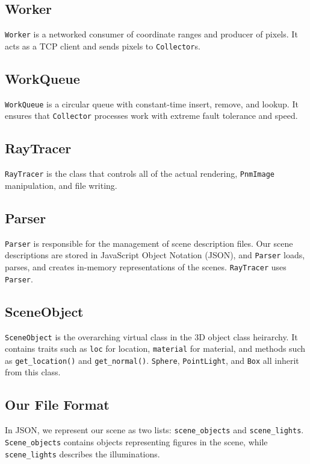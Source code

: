 \documentclass[letterpaper,twocolumn,10pt]{article}
\begin{document}
\subsection{Worker}

\verb|Worker| is a networked consumer of coordinate ranges and producer of
pixels. It acts as a TCP client and sends pixels to \verb|Collector|s.

\subsection{WorkQueue}

\verb|WorkQueue| is a circular queue with constant-time insert, remove, and
lookup. It ensures that \verb|Collector| processes work with extreme fault
tolerance and speed.

\subsection{RayTracer}

\verb|RayTracer| is the class that controls all of the actual rendering,
\verb|PnmImage| manipulation, and file writing.

\subsection{Parser}

\verb|Parser| is responsible for the management of scene description files. Our
scene descriptions are stored in JavaScript Object Notation (JSON), and
\verb|Parser| loads, parses, and creates in-memory representations of the
scenes. \verb|RayTracer| uses \verb|Parser|.

\subsection{SceneObject}

\verb|SceneObject| is the overarching virtual class in the 3D object class
heirarchy. It contains traits such as \verb|loc| for location, \verb|material|
for material, and methods such as \verb|get_location()| and \verb|get_normal()|.
\verb|Sphere|, \verb|PointLight|, and \verb|Box| all inherit from this class.

\subsection{Our File Format}

In JSON, we represent our scene as two lists: \verb|scene_objects| and 
\verb|scene_lights|. \verb|Scene_objects| contains objects representing
figures in the scene, while \verb|scene_lights| describes the illuminations.
\end{document}
